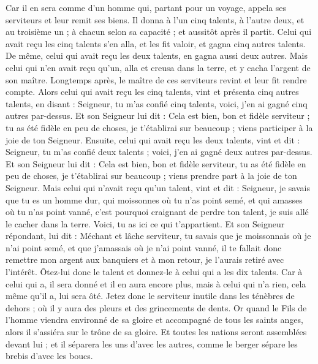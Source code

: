 \begin{multicols}{2}
Car il en sera comme d'un homme qui, partant pour un voyage, appela ses serviteurs et leur remit ses biens.
Il donna à l'un cinq talents, à l'autre deux, et au troisième un ; à chacun selon sa capacité ; et aussitôt après il partit.
Celui qui avait reçu les cinq talents s'en alla, et les fit valoir, et gagna cinq autres talents.
De même, celui qui avait reçu les deux talents, en gagna aussi deux autres.
Mais celui qui n'en avait reçu qu'un, alla et creusa dans la terre, et y cacha l'argent de son maître.
Longtemps après, le maître de ces serviteurs revint et leur fit rendre compte.
Alors celui qui avait reçu les cinq talents, vint et présenta cinq autres talents, en disant : Seigneur, tu m'as confié cinq talents, voici, j'en ai gagné cinq autres par-dessus.
Et son Seigneur lui dit : Cela est bien, bon et fidèle serviteur ; tu as été fidèle en peu de choses, je t'établirai sur beaucoup ; viens participer à la joie de ton Seigneur.
Ensuite, celui qui avait reçu les deux talents, vint et dit : Seigneur, tu m'as confié deux talents ; voici, j'en ai gagné deux autres par-dessus.
Et son Seigneur lui dit : Cela est bien, bon et fidèle serviteur, tu as été fidèle en peu de choses, je t'établirai sur beaucoup ; viens prendre part à la joie de ton Seigneur.
Mais celui qui n'avait reçu qu'un talent, vint et dit : Seigneur, je savais que tu es un homme dur, qui moissonnes où tu n'as point semé, et qui amasses où tu n'as point vanné,
c'est pourquoi craignant de perdre ton talent, je suis allé le cacher dans la terre. Voici, tu as ici ce qui t'appartient.
Et son Seigneur répondant, lui dit : Méchant et lâche serviteur, tu savais que je moissonnais où je n'ai point semé, et que j'amassais où je n'ai point vanné,
il te fallait donc remettre mon argent aux banquiers et à mon retour, je l'aurais retiré avec l'intérêt.
Ôtez-lui donc le talent et donnez-le à celui qui a les dix talents.
Car à celui qui a, il sera donné et il en aura encore plus, mais à celui qui n'a rien, cela même qu'il a, lui sera ôté.
Jetez donc le serviteur inutile dans les ténèbres de dehors ; où il y aura des pleurs et des grincements de dents.
Or quand le Fils de l'homme viendra environné de sa gloire et accompagné de tous les saints anges, alors il s'assiéra sur le trône de sa gloire.
Et toutes les nations seront assemblées devant lui ; et il séparera les uns d'avec les autres, comme le berger sépare les brebis d'avec les boucs.

\end{multicols}
